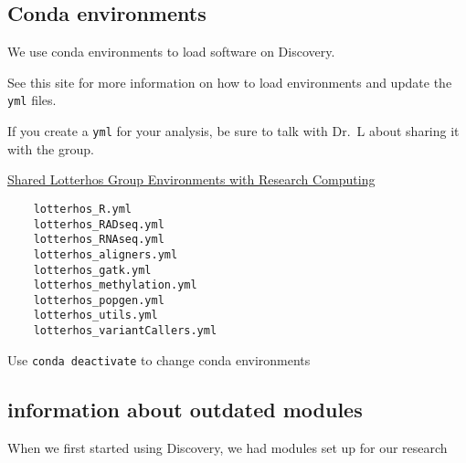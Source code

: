 \documentclass[
  letterpaper,
  DIV=11,
  numbers=noendperiod]{scrreprt}
\begin{document}

\hypertarget{conda-environments}{%
\subsection*{\texorpdfstring{\textbf{Conda
environments}}{Conda environments}}\label{conda-environments}}

We use conda environments to load software on Discovery.

See this site for more information on how to load environments and
update the \texttt{yml} files.

If you create a \texttt{yml} for your analysis, be sure to talk with
Dr.~L about sharing it with the group.

\href{https://github.com/neu-rc-admin/lotterhos_group}{Shared Lotterhos
Group Environments with Research Computing}

\begin{verbatim}
    lotterhos_R.yml
    lotterhos_RADseq.yml
    lotterhos_RNAseq.yml
    lotterhos_aligners.yml
    lotterhos_gatk.yml
    lotterhos_methylation.yml
    lotterhos_popgen.yml
    lotterhos_utils.yml
    lotterhos_variantCallers.yml
\end{verbatim}

Use \texttt{conda\ deactivate} to change conda environments

\hypertarget{information-about-outdated-modules}{%
\subsection*{\texorpdfstring{\textbf{information about outdated
modules}}{information about outdated modules}}\label{information-about-outdated-modules}}

When we first started using Discovery, we had modules set up for our
research
\end{document}

